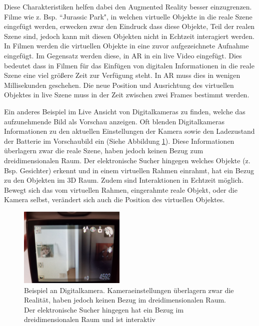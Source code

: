 Diese Charakteristiken helfen dabei den Augmented Reality besser einzugrenzen. \cite{Azuma.1997} Filme wie z. Bsp. ``Jurassic Park", in welchen virtuelle Objekte in die reale Szene eingefügt werden, 
erwecken zwar den Eindruck dass diese Objekte, Teil der realen Szene sind, jedoch kann mit diesen Objekten nicht in Echtzeit interagiert werden. \cite{Tonnis2010} In Filmen werden die virtuellen Objekte in eine zuvor aufgezeichnete Aufnahme eingefügt. 
Im Gegensatz werden diese, in AR in ein live Video eingefügt. Dies bedeutet dass in  Filmen für das Einfügen von digitalen Informationen in die reale Szene eine viel größere Zeit zur Verfügung steht. 
In AR muss dies in wenigen Millisekunden geschehen. Die neue Position und Ausrichtung des virtuellen Objektes in live Szene muss in der Zeit zwischen zwei Frames bestimmt werden.

Ein anderes Beispiel im Live Ansicht von Digitalkameras zu finden, welche das aufzunehmende Bild als Vorschau anzeigen. Oft blenden Digitalkameras Informationen zu den aktuellen Einstellungen der Kamera sowie den Ladezustand der Batterie im Vorschaubild ein (Siehe Abbildung \ref{img:ar_camera_example}).  
Diese Informationen überlagern zwar die reale Szene, haben jedoch keinen Bezug zum dreidimensionalen Raum. Der elektronische Sucher hingegen welches Objekte (z. Bsp. Gesichter) erkennt und in einem virtuellen Rahmen einrahmt, hat ein Bezug zu den Objekten im 3D Raum. Zudem sind Interaktionen in Echtzeit möglich. Bewegt sich das vom virtuellen Rahmen, eingerahmte reale Objekt, oder die Kamera selbst, verändert sich auch die Position des virtuellen Objektes. 

\begin{figure}[H]
	\centering
	\includegraphics[width=0.45\textwidth]{resources/fundamentals/example_camera_screen_ar}
	\caption{Beispiel an Digitalkamera. Kameraeinstellungen überlagern zwar die Realität, haben jedoch keinen Bezug im dreidimensionalen Raum. Der elektronische Sucher hingegen hat ein Bezug im dreidimensionalen Raum und ist interaktiv \cite{Beispiel Dititalkamera}}
	\label{img:ar_camera_example}
\end{figure}

